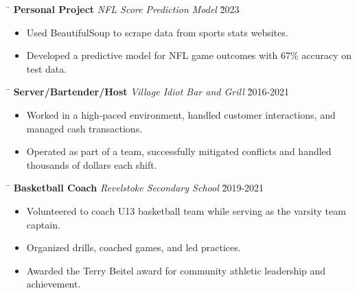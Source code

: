 \documentclass[a4paper,11pt]{article}
\def\locationh{\hspace{7cm}}
\def\subsectionv{\vspace{-5.3ex}}
\def\postpointsv{\vspace{0cm}}
\def\betweenjobsv{\vspace{0.4cm}}
\begin{document}
\betweenjobsv

\begin{tabbing}
    \locationh \= \kill
    \textbf{Personal Project} \> \textit{NFL Score Prediction Model} \` 2023 \\
\end{tabbing}

\begin{itemize}[leftmargin=.5cm, itemsep=.1cm, before=\subsectionv, after=\postpointsv]
    \item Used BeautifulSoup to scrape data from sports stats websites.
    \item Developed a predictive model for NFL game outcomes with 67\% accuracy on test data.
\end{itemize}

\betweenjobsv

\begin{tabbing}
    \locationh \= \kill
    \textbf{Server/Bartender/Host} \> \textit{Village Idiot Bar and Grill} \` 2016-2021 \\
\end{tabbing}

\begin{itemize}[leftmargin=.5cm, itemsep=.1cm, before=\subsectionv, after=\postpointsv]
    \item Worked in a high-paced environment, handled customer interactions, and managed cash transactions.
    \item Operated as part of a team, successfully mitigated conflicts and handled thousands of dollars each shift.
\end{itemize}

\betweenjobsv

\begin{tabbing}
    \locationh \= \kill
    \textbf{Basketball Coach} \> \textit{Revelstoke Secondary School} \` 2019-2021\\
\end{tabbing}

\begin{itemize}[leftmargin=.5cm, itemsep=.1cm, before=\subsectionv, after=\postpointsv]
    \item Volunteered to coach U13 basketball team while serving as the varsity team captain.
    \item Organized drills, coached games, and led practices.
    \item Awarded the Terry Beitel award for community athletic leadership and achievement.
\end{itemize}
\end{document}

